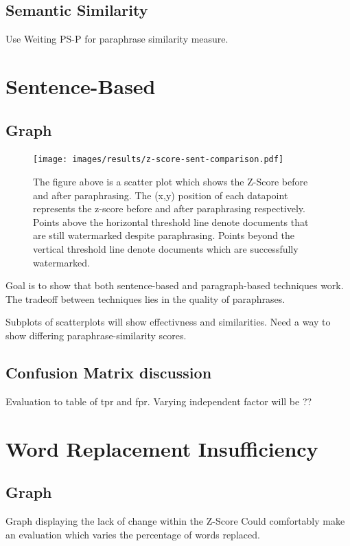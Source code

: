 \documentclass{l4proj}
\theoremstyle{definition}
\begin{document}
    \subsection{Semantic Similarity}
        Use Weiting PS-P for paraphrase similarity measure. \citep{wieting2021paraphrastic}
\section{Sentence-Based}

    \subsection{Graph}
        \begin{figure}[h]
        \centering
        \texttt{[image: images/results/z-score-sent-comparison.pdf]}
            \caption{The figure above is a scatter plot which shows the Z-Score before and after paraphrasing. The (x,y) position of each datapoint represents the z-score before and after paraphrasing respectively. Points above the horizontal threshold line denote documents that are still watermarked despite paraphrasing. Points beyond the vertical threshold line denote documents which are successfully watermarked.}
        \label{fig:paragraph-z-score} 
    \end{figure}
    
        Goal is to show that both sentence-based and paragraph-based techniques work. The tradeoff between techniques lies in the quality of paraphrases.

        Subplots of scatterplots will show effectivness and similarities.
        Need a way to show differing paraphrase-similarity scores.
    \subsection{Confusion Matrix discussion}
        Evaluation to table of tpr and fpr. Varying independent factor will be ??
\section{Word Replacement Insufficiency}
    
    \subsection{Graph}
        Graph displaying the lack of change within the Z-Score
        Could comfortably make an evaluation which varies the percentage of words replaced.
\end{document}
